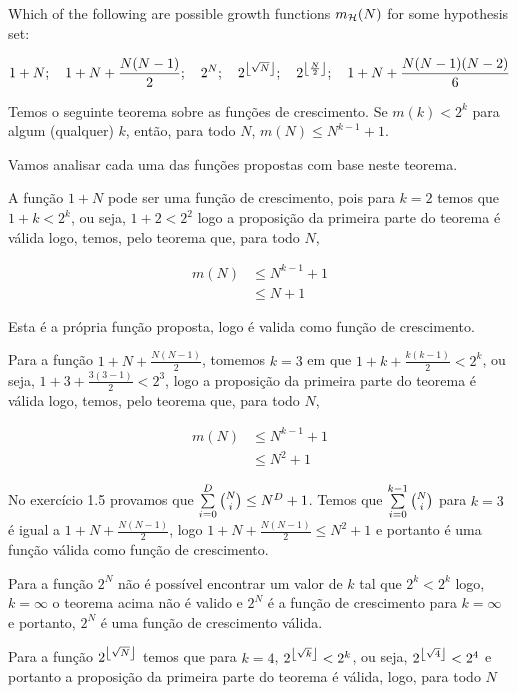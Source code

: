 \begin{enunciado}{8}
    Which of the following are possible growth functions $m_{\mathcal{H}}(N)$ for some hypothesis set:
    
    $$1+N; \quad 1+N+\frac{N(N-1)}{2}; \quad 
    2^N; \quad 2^{\left\lfloor \sqrt{N} \right\rfloor}; \quad 
    2^{\left\lfloor \frac{N}{2} \right\rfloor}; \quad
    1+N+\frac{N(N-1)(N-2)}{6}$$
\end{enunciado}

Temos o seguinte teorema sobre as funções de crescimento. Se $m(k)<2^k$ para algum (qualquer) $k$, então, para todo $N$, $m(N)\le N^{k-1}+1$.

Vamos analisar cada uma das funções propostas com base neste teorema.

A função $1+N$ pode ser uma função de crescimento, pois para $k = 2$ temos que $1 + k < 2^k$, ou seja, $1 + 2 < 2^2$  logo a proposição da primeira parte do teorema é válida logo, temos, pelo teorema que, para todo $N$, 

\begin{align*}
    m(N) &\leq N^{k-1}+1 \\
    & \leq N + 1
\end{align*}

Esta é a própria função proposta, logo é valida como função de crescimento.

Para a função $1+N+\frac{N(N-1)}{2}$, tomemos $k = 3$ em que $1+k+\frac{k(k-1)}{2} < 2^k$, ou seja, $1+3+\frac{3(3-1)}{2} < 2^3$, logo a proposição da primeira parte do teorema é válida logo, temos, pelo teorema que, para todo $N$, 

\begin{align*}
    m(N) &\leq N^{k-1}+1 \\
    & \leq N^2 + 1
\end{align*}

No exercício 1.5 provamos que $\sum\limits_{i=0}^{D} {{N} \choose {i}} \le N^D + 1$. Temos que $\sum\limits_{i=0}^{k-1} {{N} \choose {i}}$ para $k = 3$ é igual a $1+N+\frac{N(N-1)}{2}$, logo $1+N+\frac{N(N-1)}{2} \leq N^2 + 1$ e portanto é uma função válida como função de crescimento.

Para a função $2^N$ não é possível encontrar um valor de $k$ tal que $2^k < 2^k$ logo, $k = \infty$ o teorema acima não é valido e $2^N$ é a função de crescimento para $k = \infty$ e portanto, $2^N$ é uma função de crescimento válida.

Para a função $2^{\left\lfloor \sqrt{N} \right\rfloor}$ temos que para $k = 4$, $2^{\left\lfloor \sqrt{k} \right\rfloor} < 2^k$, ou seja, $2^{\left\lfloor \sqrt{4} \right\rfloor} < 2^4$ e portanto a proposição da primeira parte do teorema é válida, logo, para todo $N$

